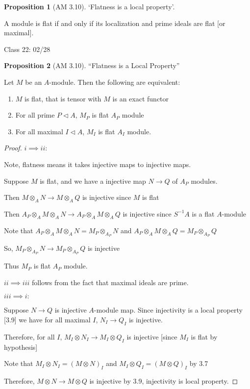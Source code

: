 \documentclass{article}
\theoremstyle{definition}
\newtheorem{proposition}{Proposition}
\begin{document}
\begin{proposition}
    [AM 3.10]

    `Flatness is a local property'.

    A module is flat if and only if its localization and prime ideals are flat [or maximal].
\end{proposition}

\hrulefill

Class 22: 02/28

\begin{proposition}
    [AM 3.10]

    ``Flatness is a Local Property''

    Let \(M\) be an \(A\)-module. Then the following are equivalent:

    \begin{enumerate}
        \item \(M\) is flat, that is tensor with \(M\) is an exact functor
        \item For all prime \(P \triangleleft A\), \(M_P\) is flat \(A_P\) module
        \item For all maximal \(I \triangleleft A\), \(M_I\) is flat \(A_I\) module. 
    \end{enumerate}

\end{proposition}

\begin{proof}
    \(i \implies ii\):

    Note, flatness means it takes injective maps to injective maps.

    Suppose \(M\) is flat, and we have a injective map \(N \to Q\) of \(A_P\) modules.

    Then \(M \otimes_A N \to M \otimes_A Q\) is injective since \(M\) is flat

    Then \(A_P \otimes_A M \otimes_A N \to A_P \otimes_A M \otimes_A Q\) is injective since \(S ^{-1} A\) is a flat \(A\)-module

    Note that \(A_P \otimes_A M \otimes_A N = M_P \otimes_{A_P} N\) and \(A_P \otimes_A M \otimes_A Q = M_P \otimes_{A_P} Q\) 

    So, \(M_P \otimes_{A_P} N \to M_P \otimes_{A_P} Q\) is injective

    Thus \(M_P\) is flat \(A_P\) module.

    \(ii\implies iii\) follows from the fact that maximal ideals are prime.

    \(iii \implies i:\) 

    Suppose \(N \to Q\) is injective \(A\)-module map. Since injectivity is a local property [3.9] we have for all maximal \(I\), \(N_I \to Q_I\) is injective.
    
    Therefore, for all \(I\), \(M_I \otimes N_I \to M_I \otimes Q_I\) is injective [since \(M_I\) is flat by hypothesis]

    Note that \(M_I \otimes N_I = (M \otimes N)_I\) and \(M_I \otimes Q_I =(M \otimes Q)_I\) by 3.7

    Therefore, \(M \otimes N \to M \otimes Q\) is injective by 3.9, injectivity is local property.

\end{proof}
\end{document}
